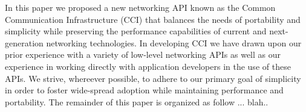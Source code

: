  
In this paper we proposed a new networking API known as the Common
Communication Infrastructure (CCI) that balances the needs of
portability and simplicity while preserving the performance
capabilities of current and next-generation networking
technologies. In developing CCI we have drawn upon our prior
experience with a variety of low-level networking APIs as well as our
experience in working directly with application developers in the use
of these APIs. We strive, whereever possible, to adhere to our primary
goal of simplicity in order to foster wide-spread adoption while
maintaining performance and portability. The remainder of this paper
is organized as follow ... blah.. 


